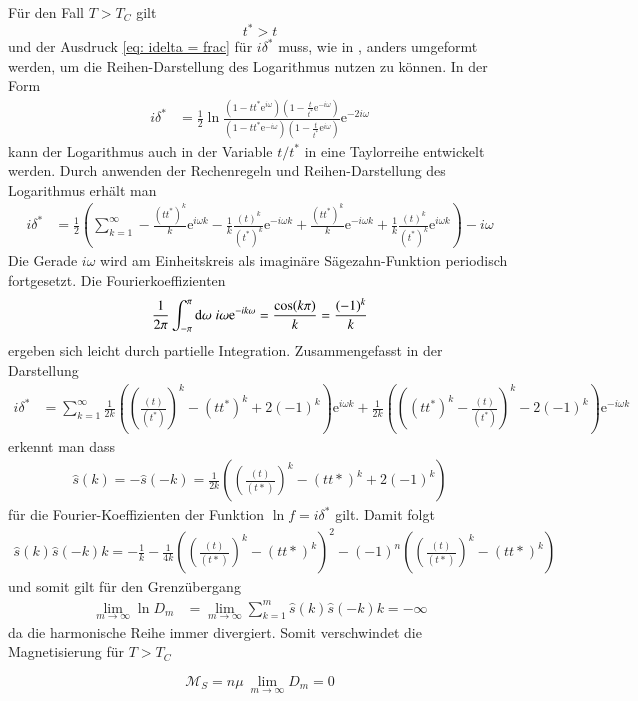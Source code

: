 Für den Fall $T > T_C$ gilt
$$ t^* > t$$
und der Ausdruck \eqref{eq: idelta = frac} für $i\delta^*$ muss, wie in \cite{Montroll_Potts_Ward}, anders umgeformt werden, um die Reihen-Darstellung des Logarithmus nutzen zu können. In der Form
\begin{align}
i \delta^* &= \frac{1}{2} \ln{ \frac{(1-tt^*\mathrm{e}^{i\omega})(1-\frac{t}{t^*}\mathrm{e}^{-i\omega})}                                  {(1-tt^*\mathrm{e}^{-i\omega})(1-\frac{t}{t^*}\mathrm{e}^{i\omega})}\mathrm{e}^{-2i\omega} } \nonumber 
\end{align}
kann der Logarithmus auch in der Variable $t/t^*$ in eine Taylorreihe entwickelt werden.
Durch anwenden der Rechenregeln und Reihen-Darstellung des Logarithmus erhält man
\begin{align}
i \delta^* &= \frac{1}{2}\left( \sum_{k = 1}^{\infty} - \frac{(tt^*)^k}{k}\mathrm{e}^{i\omega k} - \frac{1}{k}\frac{(t)^k}{(t^*)^k}\mathrm{e}^{-i\omega k} + \frac{(tt^*)^k}{k}\mathrm{e}^{-i\omega k} + \frac{1}{k}\frac{(t)^k}{(t^*)^k}\mathrm{e}^{i\omega k}\right) -i\omega  \nonumber 
\end{align}
Die Gerade $i\omega$ wird am Einheitskreis als imaginäre Sägezahn-Funktion  periodisch fortgesetzt. Die Fourierkoeffizienten
\begin{equation} \nonumber
\frac{1}{2 \pi } \int_{- \pi}^{\pi}\mathrm{d}\omega \; i\omega \mathrm{e}^{-i k \omega} = \frac{\cos(k \pi)}{k}  = \frac{(-1)^k}{k}
\end{equation}
ergeben sich leicht durch partielle Integration. Zusammengefasst in der Darstellung
\begin{align} \nonumber
i \delta^* &= \sum_{k = 1}^{\infty} \frac{1}{2k} \left(  \left(\frac{(t)}{(t^*)}\right)^k - (tt^*)^k + 2(-1)^k  \right)\mathrm{e}^{i\omega k} +  \frac{1}{2k} \left(  \left((tt^*)^k - \frac{(t)}{(t^*)}\right)^k - 2(-1)^k \right)  \mathrm{e}^{-i\omega k}
 \nonumber 
\end{align}
erkennt man dass
\begin{align} \nonumber
\hat{s}(k) = - \hat{s}(-k) = \frac{1}{2k} \left(  \left(\frac{(t)}{(t*)}\right)^k - (tt*)^k + 2(-1)^k  \right)
\end{align} 
für die Fourier-Koeffizienten der Funktion $\ln{f} = i\delta^*$ gilt. Damit folgt
\begin{align} \nonumber
\hat{s}(k)\hat{s}(-k)k = -\frac{1}{k} - \frac{1}{4k} \left(  \left(\frac{(t)}{(t*)}\right)^k - (tt*)^k\right)^2 - (-1)^n  \left(  \left(\frac{(t)}{(t*)}\right)^k - (tt*)^k\right)
\end{align}
und somit gilt für den Grenzübergang
\begin{align} \nonumber
 \lim_{m \rightarrow \infty} \ln{D_m} & = \lim_{m \rightarrow \infty} \sum_{k = 1}^{m} \hat{s}(k)\hat{s}(-k)k = -\infty 
\end{align}
da die harmonische Reihe immer divergiert. Somit verschwindet die Magnetisierung für $T > T_C$

\begin{grayframe}[frametitle = {Spontane Magnetisierung für $T < T_C$}]
\begin{equation} \label{eq: result magnetisation high}
\mathcal{M}_S = n\mu\ \lim_{m \rightarrow \infty} D_m = 0
\end{equation}
\end{grayframe}
